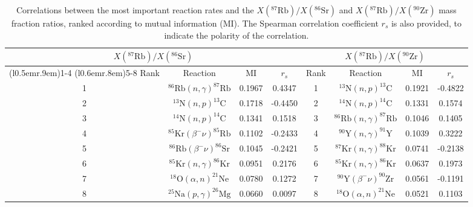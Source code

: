 \begin{table}[t]
\centering
\caption{\label{tab:mutual_info}Correlations between the most important reaction rates and the $X(^{87}\mathrm{Rb})/X(^{86}\mathrm{Sr})$ and $X(^{87}\mathrm{Rb})/X(^{90}\mathrm{Zr})$ mass fraction ratios, ranked according to mutual information (MI). The Spearman correlation coefficient $r_{s}$ is also provided, to indicate the polarity of the correlation.}
\begin{tabular}{cccc|cccc}
\hline\midrule
\multicolumn{4}{c}{$X(^{87}\mathrm{Rb})/X(^{86}\mathrm{Sr})$}&
\multicolumn{4}{c}{$X(^{87}\mathrm{Rb})/X(^{90}\mathrm{Zr})$}\\
\cmidrule[0.05pt](l{0.5em}r{.9em}){1-4} \cmidrule[0.1pt](l{0.6em}r{.8em}){5-8}
Rank&Reaction&MI&$r_{s}$&Rank&Reaction&MI&$r_{s}$\\ \midrule
1&$^{86}\mathrm{Rb}(n,\gamma)^{87}\mathrm{Rb}$&0.1967&0.4347
&1&$^{13}\mathrm{N}(n,p)^{13}\mathrm{C}$&0.1921&-0.4822\\
2&$^{13}\mathrm{N}(n,p)^{13}\mathrm{C}$&0.1718&-0.4450
&2&$^{14}\mathrm{N}(n,p)^{14}\mathrm{C}$&0.1331&0.1574\\
3&$^{14}\mathrm{N}(n,p)^{14}\mathrm{C}$&0.1341&0.1518
&3&$^{86}\mathrm{Rb}(n,\gamma)^{87}\mathrm{Rb}$&0.1046&0.1405\\
4&$^{85}\mathrm{Kr}(\beta^{-}\nu)^{85}\mathrm{Rb}$&0.1102&-0.2433
&4&$^{90}\mathrm{Y}(n,\gamma)^{91}\mathrm{Y}$&0.1039&0.3222\\
5&$^{86}\mathrm{Rb}(\beta^{-}\nu)^{86}\mathrm{Sr}$&0.1045&-0.2421
&5&$^{87}\mathrm{Kr}(n,\gamma)^{88}\mathrm{Kr}$&0.0741&-0.2138\\
6&$^{85}\mathrm{Kr}(n,\gamma)^{86}\mathrm{Kr}$&0.0951&0.2176
&6&$^{85}\mathrm{Kr}(n,\gamma)^{86}\mathrm{Kr}$&0.0637&0.1973\\
7&$^{18}\mathrm{O}(\alpha,n)^{21}\mathrm{Ne}$&0.0780&0.1272
&7&$^{90}\mathrm{Y}(\beta^{-}\nu)^{90}\mathrm{Zr}$&0.0561&-0.1191\\
8&$^{25}\mathrm{Na}(p,\gamma)^{26}\mathrm{Mg}$&0.0660&0.0097
&8&$^{18}\mathrm{O}(\alpha,n)^{21}\mathrm{Ne}$&0.0521&0.1103\\
\hline\hline
\end{tabular}
\end{table}


